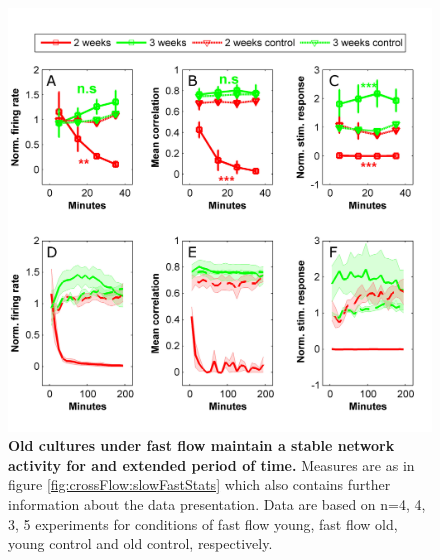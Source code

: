        \begin{figure}[!htb]
            \centering
            \includegraphics[width=15cm]{chapter5/figures/youngOldStats/youngOldGraphs.jpg}
            \caption[Averaged time course of activity measures in young versus old cultures under flow]{\textbf{Old cultures under fast flow maintain a stable network activity for and extended period of time.} Measures are as in figure \ref{fig:crossFlow:slowFastStats} which also contains further information about the data presentation. Data are based on n=4, 4, 3, 5 experiments for conditions of fast flow young, fast flow old, young control and old control, respectively.}
            \label{fig:crossFlow:youngOldStats}
        \end{figure}

